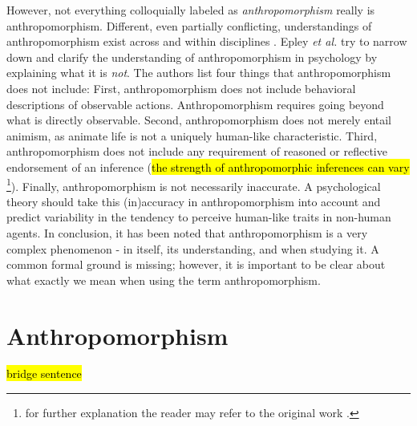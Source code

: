 \documentclass{frontiersSCNS} %
\begin{document}
However, not everything colloquially labeled as \emph{anthropomorphism} really
is anthropomorphism. Different, even partially conflicting, understandings of
anthropomorphism exist across and within disciplines
\cite{duffy_anthropomorphism_2002}. Epley \textit{et al.} \cite{epley_when_2008}
try to narrow down and clarify the understanding of anthropomorphism in
psychology by explaining what it is \textit{not}. The authors list four things
that anthropomorphism does not include: First, anthropomorphism does not include
behavioral descriptions of observable actions. Anthropomorphism requires going
beyond what is directly observable. Second, anthropomorphism does not merely
entail animism, as animate life is not a uniquely human-like characteristic.
Third, anthropomorphism does not include any requirement of reasoned or
reflective endorsement of an inference (\hl{the strength of anthropomorphic
inferences can vary} \footnote{for further explanation the reader may refer to
the original work \cite{epley_when_2008}.}).	Finally, anthropomorphism is not
necessarily inaccurate. A psychological theory should take this (in)accuracy in
anthropomorphism into account and predict variability in the tendency to
perceive human-like traits in non-human agents.  In conclusion, it has been
noted that anthropomorphism is a very complex phenomenon - in itself, its
understanding, and when studying it. A common formal ground is missing; however,
it is important to be clear about what exactly we mean when using the term
anthropomorphism.


%
%
%
%
%
%
%
%
%

\vspace{2cm}
\section{Anthropomorphism}
\label{sec:anthropomorphism}

\hl{bridge sentence}
\end{document}
